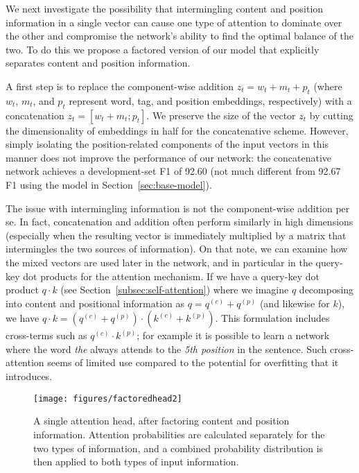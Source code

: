 \documentclass[11pt,a4paper]{article}
\begin{document}
We next investigate the possibility that intermingling content and position information in a single vector can cause one type of attention to dominate over the other and compromise the network's ability to find the optimal balance of the two. To do this we propose a factored version of our model that explicitly separates content and position information.

A first step is to replace the component-wise addition $z_t = w_t + m_t + p_t$ (where $w_t$, $m_t$, and $p_t$ represent word, tag, and position embeddings, respectively) with a concatenation $z_t = [w_t+m_t ; p_t]$. We preserve the size of the vector $z_t$ by cutting the dimensionality of embeddings in half for the concatenative scheme. However, simply isolating the position-related components of the input vectors in this manner does not improve the performance of our network: the concatenative network achieves a development-set F1 of 92.60 (not much different from 92.67 F1 using the model in Section~\ref{sec:base-model}).

\newcommand{\content}[1]{{#1}^{(c)}}
\newcommand{\position}[1]{{#1}^{(p)}}
The issue with intermingling information is not the component-wise addition per se. In fact, concatenation and addition often perform similarly in high dimensions (especially when the resulting vector is immediately multiplied by a matrix that intermingles the two sources of information). On that note, we can examine how the mixed vectors are used later in the network, and in particular in the query-key dot products for the attention mechanism. If we have a query-key dot product $q \cdot k$ (see Section~\ref{subsec:self-attention}) where we imagine $q$ decomposing into content and positional information as $q = \content{q} + \position{q}$ (and likewise for $k$), we have $q \cdot k = (\content{q} + \position{q}) \cdot (\content{k} + \position{k})$. This formulation includes cross-terms such as $\content{q} \cdot \position{k}$; for example it is possible to learn a network where the word \emph{the} always attends to the \emph{5th position} in the sentence. Such cross-attention seems of limited use compared to the potential for overfitting that it introduces.

\begin{figure}
  \centering
    \texttt{[image: figures/factoredhead2]}
    \caption{A single attention head, after factoring content and position information. Attention probabilities are calculated separately for the two types of information, and a combined probability distribution is then applied to both types of input information.}
    \label{fig:factored-head}
\end{figure}
\end{document}
